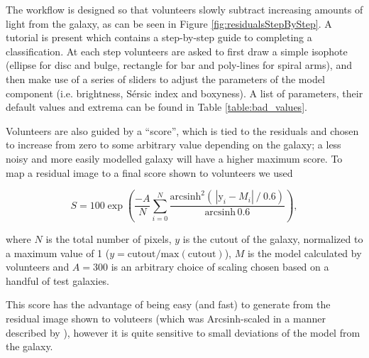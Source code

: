 \documentclass[../main.tex]{subfiles}
\begin{document}
The workflow is designed so that volunteers slowly subtract increasing amounts of light from the galaxy, as can be seen in Figure \ref{fig:residualsStepByStep}. A tutorial is present which contains a step-by-step guide to completing a classification. At each step volunteers are asked to first draw a simple isophote (ellipse for disc and bulge, rectangle for bar and poly-lines for spiral arms), and then make use of a series of sliders to adjust the parameters of the model component (i.e. brightness, S\'ersic index and boxyness). A list of parameters, their default values and extrema can be found in Table \ref{table:bad_values}.

Volunteers are also guided by a ``score'', which is tied to the residuals and chosen to increase from zero to some arbitrary value depending on the galaxy; a less noisy and more easily modelled galaxy will have a higher maximum score. To map a residual image to a final score shown to volunteers we used

\begin{equation}
  \label{eq:gal_score}
    S = 100 \exp\left(\frac{-A}{N}\sum_{i=0}^N\frac{\text{arcsinh}^2\left(\,|\text{y}_i - M_i|\ /\ 0.6\right)}{\text{arcsinh}\,0.6 }\right),
\end{equation}

where $N$ is the total number of pixels, $y$ is the cutout of the galaxy, normalized to a maximum value of 1 ($y = \text{cutout}/\text{max}(\text{cutout})$), $M$ is the model calculated by volunteers and $A=300$ is an arbitrary choice of scaling chosen based on a handful of test galaxies.

This score has the advantage of being easy (and fast) to generate from the residual image shown to voluteers (which was Arcsinh-scaled in a manner described by \citealt{Lupton2003:astro-ph/0312483v1}), however it is quite sensitive to small deviations of the model from the galaxy.
\end{document}
